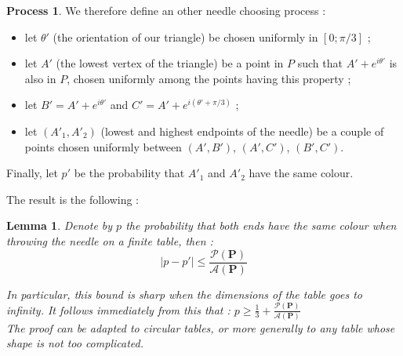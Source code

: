 \documentclass[a4paper,11pt]{article}
\newtheorem{lemma}{Lemma}
\theoremstyle{definition}
\newtheorem{process}{Process}
\theoremstyle{remark}
\begin{document}
\begin{process}
We therefore define an other needle choosing process :
\begin{itemize}
  \item let $\theta '$ (the orientation of our triangle) be chosen uniformly in $[0;\pi / 3]$ ;
  \item let $A'$ (the lowest vertex of the triangle) be a point in $P$ such that $A' + e^{i\theta '}$ is also in $P$, chosen uniformly among the points having this property ;
  \item let $B' = A' + e^{i \theta '}$ and $C' = A' + e^{i (\theta ' + \pi / 3 ) }$ ;
  \item let $(A'_1,A'_2)$ (lowest and highest endpoints of the needle) be a couple of points chosen uniformly between $(A',B')$, $(A',C')$, $(B',C')$.
\end{itemize}
Finally, let $p'$ be the probability that $A'_1$ and $A'_2$ have the same colour.
\end{process}


The result is the following :
\begin{lemma}
Denote by $p$ the probability that both ends have the same colour when throwing the needle on a finite table, then :
 $$ | p - p'| \leq \frac{\mathcal{P}(\mathbf{P})}{\mathcal{A}(\mathbf{P})} $$

In particular, this bound is sharp when the dimensions of the table goes to infinity. It follows immediately from this that : $p \geq \frac13 + \frac{\mathcal{P}(\mathbf{P})}{\mathcal{A}(\mathbf{P})}$ \\
The proof can be adapted to circular tables, or more generally to any table whose shape is not too complicated. \\
\end{lemma}
\end{document}
